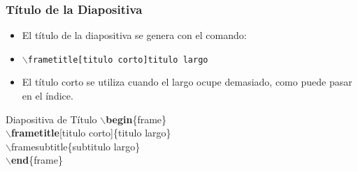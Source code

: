 \documentclass[aspectratio=43]{beamer}%
\begin{document}
\begin{frame}[fragile]
\frametitle{\textbf{Título de la Diapositiva}}
\justifying
 \begin{itemize}\justifying
  \item El título de la diapositiva se genera con el comando:
  \item []\texttt{$\backslash$frametitle[titulo corto]titulo largo}
  \item El título corto se utiliza cuando el largo ocupe demasiado, como puede pasar en el índice.
\end{itemize}
 \begin{exampleblock}{Diapositiva de Título}
$\backslash$\textbf{begin}\{frame\}\\
$\backslash$\textbf{frametitle}[titulo corto]\{titulo largo\}\\
$\backslash$framesubtitle\{subtitulo largo\}\\
$\backslash$\textbf{end}\{frame\}\\
\end{exampleblock}
\end{frame}

\end{document}
